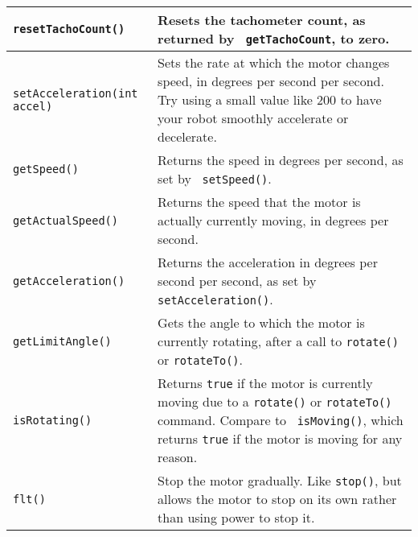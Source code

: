 \documentclass[11pt]{article}
\theoremstyle{plain}
\theoremstyle{definition}
\theoremstyle{remark}
\begin{document}
\begin{center}
  \begin{tabular}{|l|p{20em}|}
    \hline
    {\tt resetTachoCount()} & Resets the tachometer count, as returned by {\tt
    getTachoCount}, to zero. \\\hline
    {\tt setAcceleration(int accel)} & Sets the rate at which the motor changes
    speed, in degrees per second per second. Try using a small value like 200 to
    have your robot smoothly accelerate or decelerate. \\\hline
    {\tt getSpeed()} & Returns the speed in degrees per second, as set by {\tt
    setSpeed()}. \\\hline
    {\tt getActualSpeed()} & Returns the speed that the motor is actually
    currently moving, in degrees per second. \\\hline
    {\tt getAcceleration()} & Returns the acceleration in degrees per second per
    second, as set by {\tt setAcceleration()}. \\\hline
    {\tt getLimitAngle()} & Gets the angle to which the motor is currently
    rotating, after a call to {\tt rotate()} or {\tt rotateTo()}. \\\hline
    {\tt isRotating()} & Returns {\tt true} if the motor is currently moving due
    to a {\tt rotate()} or {\tt rotateTo()} command. Compare to {\tt
    isMoving()}, which returns {\tt true} if the motor is moving for any reason.
    \\\hline
    {\tt flt()} & Stop the motor gradually. Like {\tt stop()}, but allows the
    motor to stop on its own rather than using power to stop it. \\\hline
  \end{tabular}
\end{center}
\end{document}
